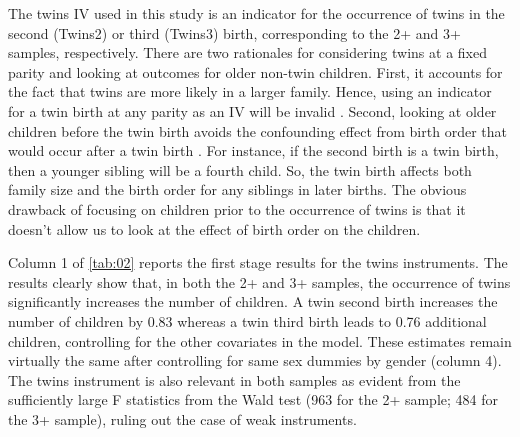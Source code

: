 The twins IV used in this study is an indicator for the occurrence of twins in the second (Twins2) or third (Twins3) birth, corresponding to the 2+ and 3+ samples, respectively. There are two rationales for considering twins at a fixed parity and looking at outcomes for older non-twin children. First, it accounts for the fact that twins are more likely in a larger family. Hence, using an indicator for a twin birth at any parity as an IV will be invalid \parencite{oberg_casual_2021}. Second, looking at older children before the twin birth avoids the confounding effect from birth order that would occur after a twin birth \parencite{Black2010}. For instance, if the second birth is a twin birth, then a younger sibling will be a fourth child. So, the twin birth affects both family size and the birth order for any siblings in later births. The obvious drawback of focusing on children prior to the occurrence of twins is that it doesn't allow us to look at the effect of birth order on the children.  

Column 1 of \autoref{tab:02} reports the first stage results for the twins instruments. The results clearly show that, in both the 2+ and 3+ samples, the occurrence of twins significantly increases the number of children. A twin second birth increases the number of children by 0.83 whereas a twin third birth leads to 0.76 additional children, controlling for the other covariates in the model. These estimates remain virtually the same after controlling for same sex dummies by gender (column 4).  The twins instrument is also relevant in both samples as evident from the sufficiently large F statistics from the Wald test (963 for the 2+ sample; 484 for the 3+ sample), ruling out the case of weak instruments. 


